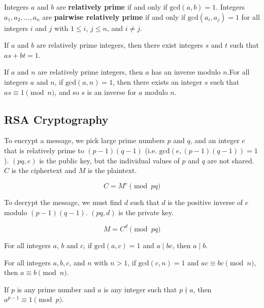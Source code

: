 \begin{definition}
    Integers $a$ and $b$ are \textbf{relatively prime} if and only if $\text{gcd}(a,b)=1$. Integers $a_1,a_2,\ldots,a_n$ are \textbf{pairwise relatively prime} if and only if $\text{gcd}(a_i,a_j)=1$ for all integers $i$ and $j$ with $1 \leq i$, $j\leq n$, and $i\neq j$.
\end{definition}

\begin{corollary}
    If $a$ and $b$ are relatively prime integers, then there exist integers $s$ and $t$ such that $as+bt=1$.
\end{corollary}

\begin{corollary}
    If $a$ and $n$ are relatively prime integers, then $a$ has an inverse modulo $n$.For all integers $a$ and $n$, if $\text{gcd}(a,n)=1$, then there exists an integer $s$ such that $as\equiv 1 \pmod n$, and so $s$ is an inverse for $a$ modulo $n$.
\end{corollary}

\subsection*{RSA Cryptography}

To encrypt a message, we pick large prime numbers $p$ and $q$, and an integer $e$ that is relatively prime to $(p-1)(q-1)$ (i.e. $\text{gcd}(e,(p-1)(q-1))=1$). $(pq,e)$ is the public key, but the individual values of $p$ and $q$ are not shared. $C$ is the ciphertext and $M$ is the plaintext.

$$ C = M^e \pmod {pq} $$

To decrypt the message, we must find $d$ such that $d$ is the positive inverse of $e$ modulo $(p-1)(q-1)$. $(pq,d)$ is the private key.

$$ M = C^d \pmod {pq} $$

\begin{theorem}
    For all integers $a$, $b$ and $c$, if $\text{gcd}(a,c)=1$ and $a\mid bc$, then $a\mid b$.
\end{theorem}

\begin{theorem}
    For all integers $a,b,c$, and $n$ with $n>1$, if $\text{gcd}(c,n)=1$ and $ac \equiv bc \pmod n$, then $a \equiv b \pmod n$.
\end{theorem}

\begin{theorem}
    If $p$ is any prime number and $a$ is any integer such that $p \nmid a$, then $a^{p-1} \equiv 1 \pmod p$.
\end{theorem}

